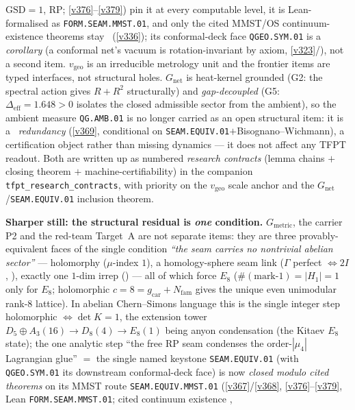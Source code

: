 \documentclass[11pt,a4paper]{article}
\newcommand{\gcar}{g_{\mathrm{car}}}
\newcommand{\Nfam}{N_{\mathrm{fam}}}
\begin{document}
$\mathrm{GSD}{=}1$, RP; \vref{v376}--\vref{v379}) pin it at every computable level, it is Lean-formalised as
\texttt{FORM.SEAM.MMST.01}, and only the cited MMST/OS continuum-existence theorems stay \mO\ (\vref{v336}); its
conformal-deck face \texttt{QGEO.SYM.01} is a \emph{corollary} (a conformal net's vacuum is rotation-invariant by axiom,
\vref{v323}/), not a second item. $v_{\mathrm{geo}}$ is an irreducible metrology
unit and the frontier items are typed interfaces, not structural holes. $G_{\mathrm{net}}$ is heat-kernel
grounded (G2: the spectral action gives $R+R^2$ structurally) and \emph{gap-decoupled} (G5:
$\Delta_{\mathrm{eff}}{=}1.648{>}0$ isolates the closed admissible sector from the ambient), so the
ambient measure \texttt{QG.AMB.01} is no longer carried as an open structural item: it is a \mC\ \emph{redundancy}
(\vref{v369}, conditional on \texttt{SEAM.EQUIV.01}${+}$Bisognano--Wichmann), a certification object rather than
missing dynamics --- it does not affect any TFPT readout. Both are written up
as numbered \emph{research contracts} (lemma chains $+$ closing theorem $+$ machine-certifiability) in the
companion \texttt{tfpt\_research\_contracts}, with priority on the $v_{\mathrm{geo}}$ scale anchor and the
$G_{\mathrm{net}}$/\texttt{SEAM.EQUIV.01} inclusion theorem.
\par\smallskip\noindent\textbf{Sharper still: the structural residual is \emph{one} condition.} $G_{\mathrm{metric}}$,
the carrier P2 and the red-team Target~A are not separate items: they are three provably-equivalent faces of
the single condition \emph{``the seam carries no nontrivial abelian sector''} --- holomorphy ($\mu$-index
$1$), a homology-sphere seam link ($\Gamma$ perfect $\Leftrightarrow2I$, ),
exactly one $1$-dim irrep () --- all of which force $E_8$
($\#(\text{mark-}1)=|H_1|=1$ only for $E_8$; holomorphic $c=8=\gcar+\Nfam$ gives the unique even unimodular
rank-$8$ lattice). In abelian Chern--Simons language this is the single integer step holomorphic
$\Leftrightarrow\det K=1$, the extension tower $D_5{\oplus}A_3(16)\to D_8(4)\to E_8(1)$ being anyon
condensation (the Kitaev $E_8$ state); the one analytic step ``the free RP seam condenses the
order-$|\mu_4|$ Lagrangian glue'' $=$ the single named keystone \texttt{SEAM.EQUIV.01} (with
\texttt{QGEO.SYM.01} its downstream conformal-deck face) is now \emph{closed modulo cited theorems} on its MMST
route \texttt{SEAM.EQUIV.MMST.01}
(\vref{v367}/\vref{v368}, \vref{v376}--\vref{v379}, Lean \texttt{FORM.SEAM.MMST.01}; cited continuum existence \mO,
\end{document}
